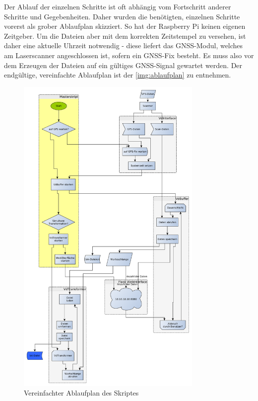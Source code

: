 \documentclass[a4paper,12pt,bibliography=totoc, listof=totoc,titlepage,pointlessnumbers]{scrreprt}
\begin{document}
Der Ablauf der einzelnen Schritte ist oft abhängig vom Fortschritt anderer Schritte und Gegebenheiten. Daher wurden die benötigten, einzelnen Schritte vorerst als grober Ablaufplan skizziert. So hat der Raspberry Pi keinen eigenen Zeitgeber. Um die Dateien aber mit dem korrekten Zeitstempel zu versehen, ist daher eine aktuelle Uhrzeit notwendig - diese liefert das GNSS-Modul, welches am Laserscanner angeschlossen ist, sofern ein GNSS-Fix besteht. Es muss also vor dem Erzeugen der Dateien auf ein gültiges GNSS-Signal gewartet werden. Der endgültige, vereinfachte Ablaufplan ist der \autoref{img:ablaufplan} zu entnehmen. 
\begin{figure}[ht!]
 \centering
 \includegraphics[width=0.8\textwidth]{./img/Ablaufplan.png}
 \caption{Vereinfachter Ablaufplan des Skriptes}
 \label{img:ablaufplan}
\end{figure}
\end{document}
